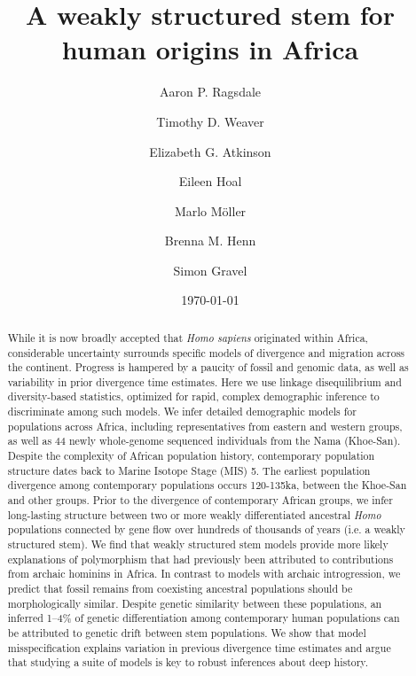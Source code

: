 \documentclass[]{article}
\begin{document}
\title{A weakly structured stem for human origins in Africa}
\author[1]{Aaron P. Ragsdale}
\author[2]{Timothy D. Weaver}
\author[3]{Elizabeth G. Atkinson}
\author[4]{Eileen Hoal}
\author[4]{Marlo M\"{o}ller}
\author[2,5,$\dag$,*]{Brenna M. Henn}
\author[6,$\dag$,**]{Simon Gravel}
\date{\normalsize \today}
\maketitle

\begin{abstract}
While it is now broadly accepted that \emph{Homo sapiens}
originated within Africa, considerable
uncertainty surrounds specific models of divergence and migration across the
continent. Progress is hampered by a paucity of fossil and genomic data, as
well as variability in prior divergence time estimates.
Here we use linkage disequilibrium and
diversity-based statistics, optimized for rapid, complex demographic inference
to discriminate among such models.
We infer detailed demographic models for
populations across Africa, including representatives from eastern and western
groups, as well as 44 newly whole-genome sequenced individuals from the Nama
(Khoe-San). Despite the complexity of African population history, contemporary
population structure dates back to Marine Isotope Stage (MIS) 5. The earliest
population divergence among contemporary populations occurs 120-135ka, between
the Khoe-San and other groups. Prior to the divergence of contemporary African
groups, we infer long-lasting structure between two or more weakly
differentiated ancestral \emph{Homo}
populations connected by gene flow over
hundreds of thousands of years (i.e. a weakly structured stem). We find that
weakly structured stem models provide more likely explanations of polymorphism
that had previously been attributed to contributions from archaic hominins in
Africa.
In contrast to models with archaic introgression, we predict that fossil
remains from coexisting ancestral populations should be morphologically
similar.
Despite genetic similarity between these populations, an inferred 1--4\%
of genetic differentiation among contemporary human populations can be
attributed to genetic drift between stem populations.
We show that model misspecification explains variation in previous
divergence time estimates and argue that studying a suite of models is key to
robust inferences about deep history.
\end{abstract}
\end{document}
